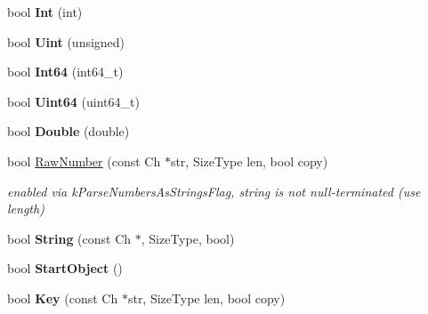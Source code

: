 \begin{DoxyCompactItemize}
\item 
bool {\bfseries Int} (int)\hypertarget{struct_base_reader_handler_a85e813aaf7189a2f87bd53953324fafc}{}\label{struct_base_reader_handler_a85e813aaf7189a2f87bd53953324fafc}

\item 
bool {\bfseries Uint} (unsigned)\hypertarget{struct_base_reader_handler_a0e683306cbb7b4e350a35c18c5246f2a}{}\label{struct_base_reader_handler_a0e683306cbb7b4e350a35c18c5246f2a}

\item 
bool {\bfseries Int64} (int64\+\_\+t)\hypertarget{struct_base_reader_handler_a04011733ea584739c97ad5c6afa15a35}{}\label{struct_base_reader_handler_a04011733ea584739c97ad5c6afa15a35}

\item 
bool {\bfseries Uint64} (uint64\+\_\+t)\hypertarget{struct_base_reader_handler_a351aa3cd81856a487c21022e9cc64d2b}{}\label{struct_base_reader_handler_a351aa3cd81856a487c21022e9cc64d2b}

\item 
bool {\bfseries Double} (double)\hypertarget{struct_base_reader_handler_a8156ea6ae5b8cd23a8b700e92a8af1eb}{}\label{struct_base_reader_handler_a8156ea6ae5b8cd23a8b700e92a8af1eb}

\item 
bool \hyperlink{struct_base_reader_handler_a9ed0d83d5e6c8f5e4b32ca3735ff0bb7}{Raw\+Number} (const Ch $\ast$str, Size\+Type len, bool copy)\hypertarget{struct_base_reader_handler_a9ed0d83d5e6c8f5e4b32ca3735ff0bb7}{}\label{struct_base_reader_handler_a9ed0d83d5e6c8f5e4b32ca3735ff0bb7}

\begin{DoxyCompactList}\small\item\em enabled via k\+Parse\+Numbers\+As\+Strings\+Flag, string is not null-\/terminated (use length) \end{DoxyCompactList}\item 
bool {\bfseries String} (const Ch $\ast$, Size\+Type, bool)\hypertarget{struct_base_reader_handler_a3ac69e6326d0aeef7b1f2619742bbe00}{}\label{struct_base_reader_handler_a3ac69e6326d0aeef7b1f2619742bbe00}

\item 
bool {\bfseries Start\+Object} ()\hypertarget{struct_base_reader_handler_ab0a7d9bcececb8d6ed748656f67f4917}{}\label{struct_base_reader_handler_ab0a7d9bcececb8d6ed748656f67f4917}

\item 
bool {\bfseries Key} (const Ch $\ast$str, Size\+Type len, bool copy)\hypertarget{struct_base_reader_handler_abc50b2e7e411b7b731715e05cd01e2eb}{}\label{struct_base_reader_handler_abc50b2e7e411b7b731715e05cd01e2eb}


\end{DoxyCompactItemize}
